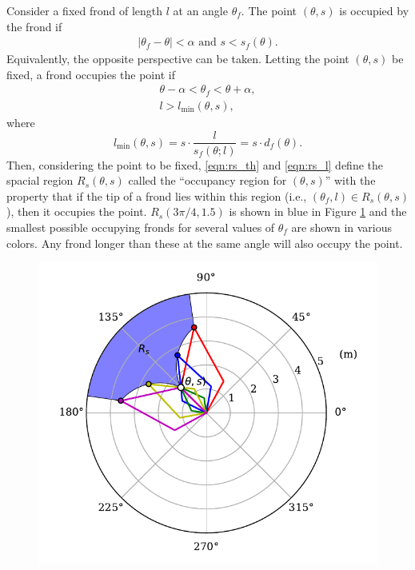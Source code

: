 \documentclass[ms,cpyr,lof,lot]{uathesis}
\begin{document}
Consider a fixed frond of length $l$ at an angle $\theta_f$. The point
$(\theta,s)$ is occupied by the frond if
\begin{align*}
	\left|\theta_f - \theta \right| < \alpha
  \mbox{ and }
	s < s_f(\theta).
\end{align*}
Equivalently, the opposite perspective can be taken.
Letting the point $(\theta,s)$ be fixed, a frond occupies the point if
\begin{align}
	\theta - \alpha < \theta_f < \theta + \alpha,
	\label{eqn:rs_th} \\
	l > l_{\min}(\theta,s),
	\label{eqn:rs_l}
\end{align}
where
\begin{equation}
	l_{\min}(\theta,s) = s \cdot \frac{l}{s_f(\theta;l)} = s \cdot d_f(\theta).
  \label{eqn:l_min}
\end{equation}
Then, considering the point to be fixed, \eqref{eqn:rs_th} and \eqref{eqn:rs_l} define the spacial region $R_s(\theta,s)$ called the ``occupancy region for $(\theta,s)$'' with the property that if the tip of a frond lies within this region (i.e., $(\theta_f,l) \in R_s(\theta,s)$), then it occupies the point.
$R_s(3\pi/4,1.5)$ is shown in blue in Figure \ref{fig:shade_area} and the smallest possible occupying fronds for several values of $\theta_f$ are shown in various colors.
Any frond longer than these at the same angle will also occupy the point.

\begin{figure}[h]
	\centering
	\includegraphics[width=4.5in]{shade_area}
	\label{fig:shade_area}
\end{figure}
\end{document}
